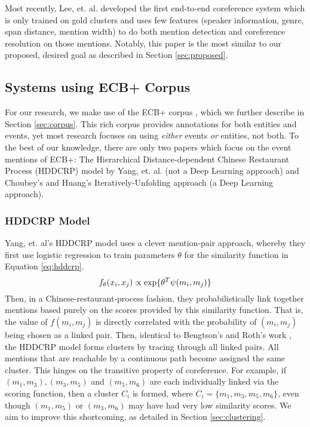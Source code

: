 Most recently, Lee, et. al. \cite{D17-1018} developed the first end-to-end coreference system which is only trained on gold clusters and uses few features (speaker information, genre, span distance, mention width) to do both mention detection and coreference resolution on those mentions.  Notably, this paper is the most similar to our proposed, desired goal as described in Section \ref{sec:proposed}.

\subsection{Systems using ECB+ Corpus}
\label{sec:ecb+systems}
For our research, we make use of the ECB+ corpus \cite{ECB+}, which we further describe in Section \ref{sec:corpus}.  This rich corpus provides annotations for both entities and events, yet most research focuses on using \textit{either} events \textit{or} entities, not both.  To the best of our knowledge, there are only two papers which focus on the event mentions of ECB+: The Hierarchical Distance-dependent Chinese Restaurant Process (HDDCRP) model by Yang, et. al. \cite{journals/tacl/YangCF15} (not a Deep Learning approach) and Choubey's and Huang's Iteratively-Unfolding approach \cite{Choubey2017EventCR} (a Deep Learning approach).

\subsubsection{HDDCRP Model}
\label{sec:HDDCRP}
Yang, et. al's HDDCRP model \cite{journals/tacl/YangCF15} uses a clever mention-pair approach, whereby they first use logistic regression to train parameters $\theta$ for the similarity function in Equation \ref{eq:hddcrp}.  
\begin{equation}
\label{eq:hddcrp}
f_{\theta}(x_i,x_j) \propto \textnormal{exp\{} \theta^T\psi(m_i,m_j)\textnormal{\}}
\end{equation}
Then, in a Chinese-restaurant-process fashion, they probabilistically link together mentions based purely on the scores provided by this similarity function.  That is, the value of $f(m_i,m_j)$ is directly correlated with the probability of $(m_i,m_j)$ being chosen as a linked pair.  Then, identical to Bengtson's and Roth's work \cite{Bengtson:2008:UVF:1613715.1613756}, the HDDCRP model forms clusters by tracing through all linked pairs. All mentions that are reachable by a continuous path become assigned the same cluster.  This hinges on the transitive property of coreference.  For example, if ${(m_1,m_3),(m_3,m_5)}$ and $(m_5,m_6)$ are each individually linked via the scoring function, then a cluster $C_i$ is formed, where $C_i = \{m_1,m_3,m_5,m_6\}$, even though $(m_1,m_5)$ or $(m_3,m_6)$ may have had very low similarity scores. We aim to improve this shortcoming, as detailed in Section \ref{sec:clustering}.

